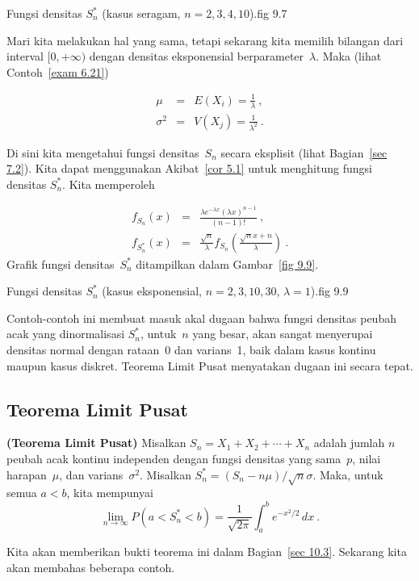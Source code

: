 {Fungsi densitas $S^*_n$ (kasus seragam, $n = 2, 3, 4, 10$).}{fig 9.7} 

\begin{example}
Mari kita melakukan hal yang sama, tetapi sekarang kita memilih bilangan dari interval
$[0,+\infty)$ dengan densitas eksponensial berparameter~$\lambda$.  Maka (lihat
Contoh~\ref{exam 6.21})
\par
\begin{eqnarray*}
\mu & = & E(X_i)  =  \frac 1\lambda\ , \\
\sigma^2 & = & V(X_j) = \frac 1{\lambda^2}\ .
\end{eqnarray*}
\par
Di sini kita mengetahui fungsi densitas~$S_n$ secara eksplisit (lihat
Bagian~\ref{sec 7.2}).  Kita dapat menggunakan Akibat~\ref{cor 5.1} untuk menghitung fungsi
densitas $S_n^*$.  Kita memperoleh
\par
\begin{eqnarray*}
  f_{S_n}(x) & = & \frac {\lambda e^{-\lambda x}(\lambda x)^{n - 1}}{(n - 1)!}\ , \\
f_{S_n^*}(x) & = & \frac {\sqrt n}\lambda f_{S_n} \left( \frac {\sqrt n x +
n}\lambda \right)\ .
\end{eqnarray*}
Grafik fungsi densitas~$S_n^*$ ditampilkan dalam Gambar~\ref{fig 9.9}.
\end{example}

{Fungsi densitas $S^*_n$ (kasus eksponensial,
$n = 2, 3, 10, 30$, $\lambda = 1$).}{fig 9.9} 

Contoh-contoh ini membuat masuk akal dugaan bahwa fungsi densitas peubah acak yang dinormalisasi
$S_n^*$, untuk~$n$ yang besar, akan sangat menyerupai densitas normal dengan rataan~0 dan varians~1, baik
dalam kasus kontinu maupun kasus diskret.  Teorema Limit Pusat menyatakan dugaan ini secara tepat.

\subsection*{Teorema Limit Pusat}
\begin{theorem}\label{thm 9.4.7}{\bf (Teorema Limit Pusat)} 
Misalkan $S_n = X_1 + X_2 +\cdots+ X_n$ adalah jumlah $n$ peubah acak kontinu independen dengan
fungsi densitas yang sama~$p$, nilai harapan~$\mu$, dan varians~$\sigma^2$.  Misalkan
$S_n^* = (S_n - n\mu)/\sqrt n \sigma$.  Maka, untuk semua $a < b$, kita mempunyai
$$
\lim_{n \to \infty} P(a < S_n^* < b) = \frac 1{\sqrt{2\pi}} \int_a^b
e^{-x^2/2}\, dx\ .
$$
\end{theorem}
\par
Kita akan memberikan bukti teorema ini dalam Bagian~\ref{sec 10.3}.  Sekarang kita akan membahas
beberapa contoh.

